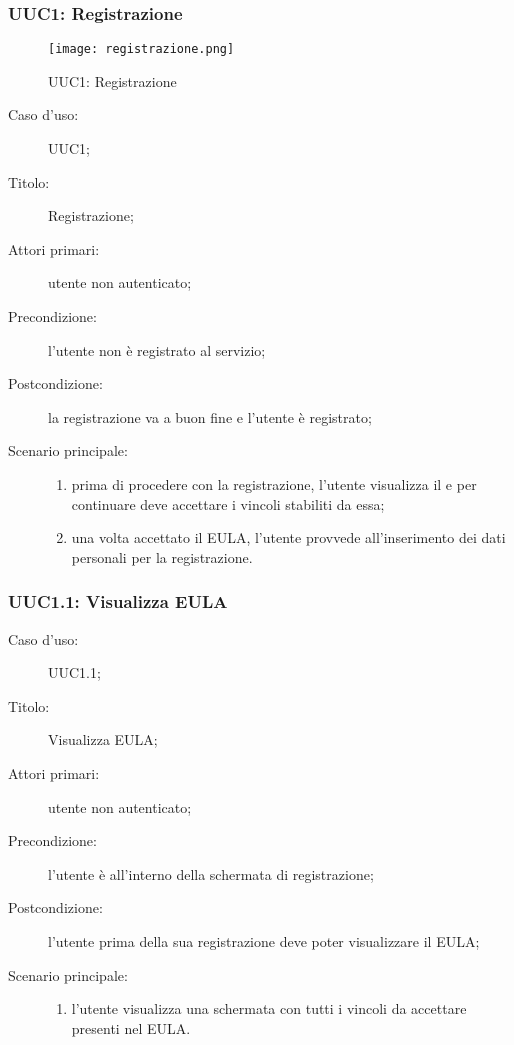 \documentclass[../../../analisi-dei-requisiti.tex]{subfiles}
\begin{document}
\subsubsection{UUC1: Registrazione}%
\label{subs:UUC1}

\begin{figure}[H]
  \centering
  \texttt{[image: registrazione.png]}
  \caption{UUC1: Registrazione}%
  \label{fig:uuc1}
\end{figure}

\begin{description}
  \item[Caso d’uso:] UUC1;
  \item[Titolo:] Registrazione;
  \item[Attori primari:] utente non autenticato;
  \item[Precondizione:] l'utente non è registrato al servizio;
  \item[Postcondizione:] la registrazione va a buon fine e l'utente è registrato;
  \item[Scenario principale:]
        \begin{enumerate}
          \item prima di procedere con la registrazione, l'utente visualizza il  e per continuare deve accettare i vincoli stabiliti da essa;
          \item una volta accettato il EULA, l'utente provvede all'inserimento dei dati personali per la registrazione.
        \end{enumerate}
\end{description}


\subsubsection{UUC1.1: Visualizza EULA}%
\label{subs:UUC1.1}
\begin{description}
  \item[Caso d’uso:] UUC1.1;
  \item[Titolo:] Visualizza EULA\@;
  \item[Attori primari:] utente non autenticato;
  \item[Precondizione:] l'utente è all'interno della schermata di registrazione;
  \item[Postcondizione:] l'utente prima della sua registrazione deve poter visualizzare il EULA\@;
  \item[Scenario principale:]
        \begin{enumerate}
          \item l'utente visualizza una schermata con tutti i vincoli da accettare presenti nel EULA\@.
        \end{enumerate}
\end{description}
\end{document}
